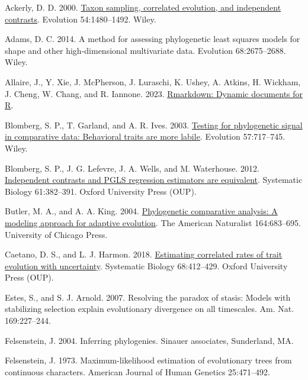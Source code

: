 \documentclass[fleqn,10pt,lineno]{wlpeerj} %
\newlength{\cslhangindent}
\newenvironment{CSLReferences}[2] %
 {\begin{list}{}{%
  \setlength{\itemindent}{0pt}
  \setlength{\leftmargin}{0pt}
  \setlength{\parsep}{0pt}
  \ifodd #1
   \setlength{\leftmargin}{\cslhangindent}
   \setlength{\itemindent}{-1\cslhangindent}
  \fi
  \setlength{\itemsep}{#2\baselineskip}}}
 {\end{list}}
\begin{document}
\label{refs}
\begin{CSLReferences}{1}{0}
Ackerly, D. D. 2000. \href{https://doi.org/10.1111/j.0014-3820.2000.tb00694.x}{Taxon sampling, correlated evolution, and independent contrasts}. Evolution 54:1480--1492. Wiley.

Adams, D. C. 2014. A method for assessing phylogenetic least squares models for shape and other high-dimensional multivariate data. Evolution 68:2675--2688. Wiley.

Allaire, J., Y. Xie, J. McPherson, J. Luraschi, K. Ushey, A. Atkins, H. Wickham, J. Cheng, W. Chang, and R. Iannone. 2023. \href{https://github.com/rstudio/rmarkdown}{{R}markdown: Dynamic documents for {R}}.

Blomberg, S. P., T. Garland, and A. R. Ives. 2003. \href{https://doi.org/10.1111/j.0014-3820.2003.tb00285.x}{Testing for phylogenetic signal in comparative data: Behavioral traits are more labile}. Evolution 57:717--745. Wiley.

Blomberg, S. P., J. G. Lefevre, J. A. Wells, and M. Waterhouse. 2012. \href{https://doi.org/10.1093/sysbio/syr118}{Independent contrasts and PGLS regression estimators are equivalent}. Systematic Biology 61:382--391. Oxford University Press (OUP).

Butler, M. A., and A. A. King. 2004. \href{https://doi.org/10.1086/426002}{Phylogenetic comparative analysis: A modeling approach for adaptive evolution}. The American Naturalist 164:683--695. University of Chicago Press.

Caetano, D. S., and L. J. Harmon. 2018. \href{https://doi.org/10.1093/sysbio/syy067}{Estimating correlated rates of trait evolution with uncertainty}. Systematic Biology 68:412--429. Oxford University Press (OUP).

Estes, S., and S. J. Arnold. 2007. Resolving the paradox of stasis: Models with stabilizing selection explain evolutionary divergence on all timescales. Am. Nat. 169:227--244.

Felsenstein, J. 2004. Inferring phylogenies. Sinauer associates, Sunderland, MA.

Felsenstein, J. 1973. Maximum-likelihood estimation of evolutionary trees from continuous characters. American Journal of Human Genetics 25:471--492.


\end{CSLReferences}
\end{document}
